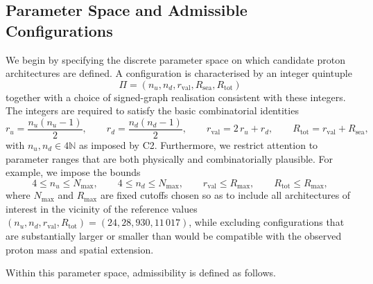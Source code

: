 \documentclass[11pt,a4paper]{article}
\begin{document}
\subsection{Parameter Space and Admissible Configurations}

We begin by specifying the discrete parameter space on which candidate proton architectures are defined. A configuration is characterised by an integer quintuple
\begin{equation}
\Pi = (n_u,n_d,r_{\mathrm{val}},R_{\mathrm{sea}},R_{\mathrm{tot}})
\end{equation}
together with a choice of signed-graph realisation consistent with these integers. The integers are required to satisfy the basic combinatorial identities
\begin{equation}
r_u = \frac{n_u(n_u-1)}{2},\qquad r_d = \frac{n_d(n_d-1)}{2},\qquad r_{\mathrm{val}} = 2\,r_u + r_d,\qquad R_{\mathrm{tot}} = r_{\mathrm{val}} + R_{\mathrm{sea}},
\end{equation}
with $n_u,n_d \in 4\mathbb{N}$ as imposed by C2.\cite{LaubscherPDLFull2026,LaubscherLDP2026} Furthermore, we restrict attention to parameter ranges that are both physically and combinatorially plausible. For example, we impose the bounds
\begin{equation}
4 \leq n_u \leq N_{\max},\qquad 4 \leq n_d \leq N_{\max},\qquad r_{\mathrm{val}} \leq R_{\max},\qquad R_{\mathrm{tot}} \leq R_{\max},
\end{equation}
where $N_{\max}$ and $R_{\max}$ are fixed cutoffs chosen so as to include all architectures of interest in the vicinity of the reference values $(n_u,n_d,r_{\mathrm{val}},R_{\mathrm{tot}})=(24,28,930,11\,017)$, while excluding configurations that are substantially larger or smaller than would be compatible with the observed proton mass and spatial extension.\cite{LaubscherPDLFull2026,LaubscherIMRadPDL2026}

Within this parameter space, admissibility is defined as follows.
\end{document}
